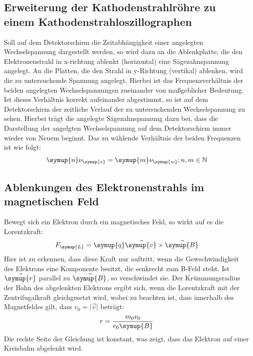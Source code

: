 \subsection{Erweiterung der Kathodenstrahlröhre zu einem Kathodenstrahloszillographen}
Soll auf dem Detektorschirm die Zeitabhängigkeit einer angelegten Wechselspannung dargestellt werden,
so wird dazu an die Ablenkplatte, die den Elektronenstrahl in x-richtung ablenkt (horizontal)
eine Sägezahnspannung angelegt. An die Platten, die den Strahl in y-Richtung (vertikal) ablenken,
wird die zu untersuchende Spannung angelegt.
Hierbei ist das Frequenzverhältnis der beiden angelegten Wechselspannungen zueinander von maßgeblicher
Bedeutung. Ist dieses Verhältnis korrekt aufeinander abgestimmt, so ist auf dem Detektorschirm
der zeitliche Verlauf der zu untersuchenden Wechselspannung zu sehen. Hierbei trägt die
angelegte Sägezahnspannung dazu bei, dass die Darstellung der angelgten Wechselspannung
auf dem Detektorschirm immer wieder von Neuem beginnt.
Das zu wählende Verhältnis der beiden Frequenzen ist wie folgt:
\begin{equation*}\label{eq3}
  \symup{n} \nu_\symup{s} = \symup{m} \nu_\symup{w}     ; n,m \in\mathbb{N}
\end{equation*}
\subsection{Ablenkungen des Elektronenstrahls im magnetischen Feld}
Bewegt sich ein Elektron durch ein magnetisches Feld, so wirkt auf es die Lorentzkraft:
\begin{align*}\label{eq4}
  F_\symup{L} = \symup{q} \vec \symup{v} \times \vec \symup{B}
\end{align*}
Hier ist zu erkennen, dass diese Kraft nur auftritt, wenn die Gewschwindigkeit des Elektrons
eine Komponente besitzt, die senkrecht zum B-Feld steht. Ist $\vec \symup{v}$ parallel zu
$\vec \symup{B}$, so verschwindet sie.
Der Krümmungsradius der Bahn des abgelenkten Elektrons ergibt sich, wenn die Lorentzkraft
mit der Zentrifugalkraft gleichgesetzt wird, wobei zu beachten ist, dass innerhalb des Magnetfeldes gilt, dass
$v_0 = \big| \vec v \big|$ beträgt:
\begin{align}
  r = \frac{m_0 v_0}{e_0 \symup{B}}
\end{align}
Die rechte Seite der Gleichung ist konstant, was zeigt, dass das Elektron auf einer Kreisbahn
abgelenkt wird.
\FloatBarrier
